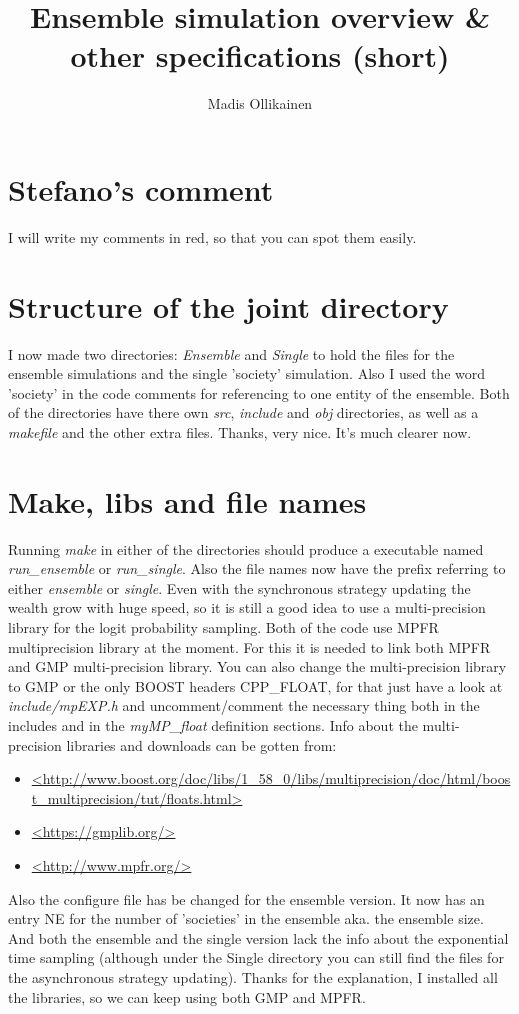 \documentclass{article}
\author{Madis Ollikainen}
\title{Ensemble simulation overview \& other specifications (short)}
\begin{document}
\maketitle
\section{Stefano's comment}
{\color{red}I will write my comments in red, so that you can spot them easily.}

\section{Structure of the joint directory}
I now made two directories: \emph{Ensemble} and \emph{Single} to hold the files for the ensemble simulations and the single 'society' simulation. Also I used the word 'society' in the code comments for referencing to one entity of the ensemble. Both of the directories have there own \emph{src}, \emph{include} and \emph{obj} directories, as well as a \emph{makefile} and the other extra files. 
{\color{red}Thanks, very nice. It's much clearer now.}

\section{Make, libs and file names}
Running \emph{make} in either of the directories should produce a executable named \emph{run\_ensemble} or \emph{run\_single}. Also the file names now have the prefix referring to either \emph{ensemble} or \emph{single}. Even with the synchronous strategy updating the wealth grow with huge speed, so it is still a good idea to use a multi-precision library for the logit probability sampling. Both of the code use MPFR multiprecision library at the moment. For this it is needed to link both MPFR and GMP multi-precision library. You can also change the multi-precision library to GMP or the only BOOST headers CPP\_FLOAT, for that just have a look at \emph{include/mpEXP.h} and uncomment/comment the necessary thing both in the includes and in the \emph{myMP\_float} definition sections. Info about the multi-precision libraries and downloads can be gotten from: 
\begin{itemize}
\item \url{<http://www.boost.org/doc/libs/1_58_0/libs/multiprecision/doc/html/boost_multiprecision/tut/floats.html>}
\item \url{<https://gmplib.org/>}       
\item \url{<http://www.mpfr.org/>}
\end{itemize}
Also the configure file has be changed for the ensemble version. It now has an entry NE for the number of 'societies' in the ensemble aka. the ensemble size. And both the ensemble and the single version lack the info about the exponential time sampling (although under the Single directory you can still find the files for the asynchronous strategy updating). 
{\color{red}Thanks for the explanation, I installed all the libraries, so we can keep using both GMP and MPFR.}
\end{document}
